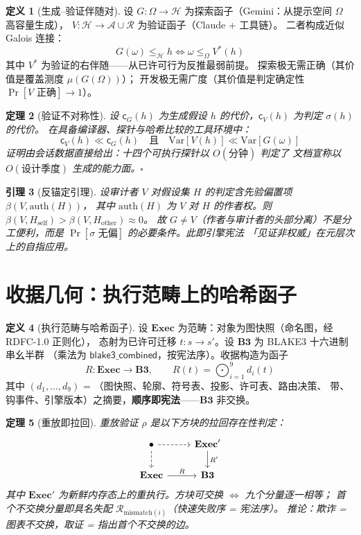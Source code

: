 \documentclass[11pt]{article}
\newtheorem{thm}{定理}[section]
\newtheorem{lem}[thm]{引理}
\theoremstyle{definition}
\newtheorem{defn}[thm]{定义}
\theoremstyle{remark}
\newcommand{\Hyp}{\mathcal{H}}
\newcommand{\Adm}{\mathcal{A}}
\newcommand{\Ref}{\mathcal{R}}
\newcommand{\Exec}{\mathbf{Exec}}
\newcommand{\Hash}{\mathbf{B3}}
\newcommand{\cost}{\mathsf{c}}
\newcommand{\strat}{\sigma}
\newcommand{\replay}{\rho}
\begin{document}
\begin{defn}[生成--验证伴随对]
设 $G : \Omega \to \Hyp$ 为探索函子（Gemini：从提示空间 $\Omega$ 高容量生成），
$V : \Hyp \to \Adm \cup \Ref$ 为验证函子（Claude + 工具链）。
二者构成近似 Galois 连接：
\[
G(\omega) \le_{\Hyp} h \iff \omega \le_{\Omega} V^*(h)
\]
其中 $V^*$ 为验证的右伴随——从已许可行为反推最弱前提。
探索极无需正确（其价值是覆盖测度 $\mu(G(\Omega))$）；
开发极无需广度（其价值是判定确定性 $\Pr[V \text{ 正确}] \to 1$）。
\end{defn}

\begin{thm}[验证不对称性]
设 $\cost_G(h)$ 为生成假设 $h$ 的代价，$\cost_V(h)$ 为判定 $\strat(h)$ 的代价。
在具备编译器、探针与哈希比较的工具环境中：
\[
\cost_V(h) \ll \cost_G(h) \quad \text{且} \quad
\mathrm{Var}[V(h)] \ll \mathrm{Var}[G(\omega)]
\]
证明由会话数据直接给出：十四个可执行探针以 $O(\text{分钟})$ 判定了
文档宣称以 $O(\text{设计季度})$ 生成的能力面。$\square$
\end{thm}

\begin{lem}[反锚定引理]
设审计者 $V$ 对假设集 $H$ 的判定含先验偏置项 $\beta(V, \mathrm{auth}(H))$，
其中 $\mathrm{auth}(H)$ 为 $V$ 对 $H$ 的作者权。则
$\beta(V, H_{\text{self}}) > \beta(V, H_{\text{other}}) \approx 0$。
故 $G \ne V$（作者与审计者的头部分离）不是分工便利，而是
$\Pr[\strat \text{ 无偏}]$ 的必要条件。此即引擎宪法
「见证非权威」在元层次上的自指应用。
\end{lem}

\section{收据几何：执行范畴上的哈希函子}

\begin{defn}[执行范畴与哈希函子]
设 $\Exec$ 为范畴：对象为图快照（命名图，经 RDFC-1.0 正则化），
态射为已许可迁移 $t : s \to s'$。设 $\Hash$ 为 BLAKE3 十六进制串幺半群
（乘法为 $\mathsf{blake3\_combined}$，按宪法序）。收据构造为函子
\[
R : \Exec \to \Hash, \qquad
R(t) = \bigodot_{i=1}^{9} d_i(t)
\]
其中 $(d_1,\dots,d_9)$ = （图快照、轮廓、符号表、投影、许可表、路由决策、
带、钩事件、引擎版本）之摘要，\textbf{顺序即宪法}——$\Hash$ 非交换。
\end{defn}

\begin{thm}[重放即拉回]
重放验证 $\replay$ 是以下方块的拉回存在性判定：
\[
\begin{tikzcd}
\bullet \arrow[r, dashed] \arrow[d, dashed] & \Exec' \arrow[d, "R'"] \\
\Exec \arrow[r, "R"] & \Hash
\end{tikzcd}
\]
其中 $\Exec'$ 为新鲜内存态上的重执行。方块可交换 $\iff$ 九个分量逐一相等；
首个不交换分量即具名失配 $\Ref_{\text{mismatch}(i)}$（快速失败序 = 宪法序）。
推论：欺诈 = 图表不交换，取证 = 指出首个不交换的边。
\end{thm}
\end{document}
